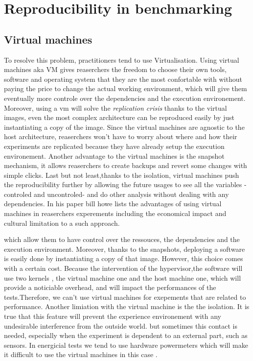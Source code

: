 


\section{Reproducibility in benchmarking }




\subsection{Virtual machines}
To resolve this problem, practitioners tend to use Virtualisation. Using virtual machines aka VM gives reaserchers the freedom to choose their own tools, software and operating system that they are the most confortable with without paying the price to change the actual working environment, which will give them eventually more controle over the dependencies and the execution environement. Moreover, using a vm will solve the \emph{replication crisis} thanks to the virtual images, even the most complex architecture can be reproduced easily by just instantiating a copy of the image. Since the virtual machines are agnostic to the host architecture, reaserchers won't have to worry about where and how their experiments are replicated because they have already setup the execution environement. Another advantage to the virtual machines is the snapshot mechanism, it allows reaserchers to create backups and revert some changes with simple clicks. Last but not least,thanks to the isolation, virtual machines push the reproducibility further by allowing the future usages to see all the variables -controled and uncontroled-  and do other analysis without dealing with any dependencies. In his paper \cite{howe_virtual_2012} bill howe lists the advantages of using virtual machines in reaserchers experements including the economical impact and cultural limitation to a such approach.

which allow them to have control over the ressouces, the dependencies and the execution environment. Moreover, thanks to the snapshots, deploying a software is easily done by instantiating a copy of that image.
However, this choice comes with a certain cost. Because the intervention of the hypervisor,the software will use two kernels , the virtual machine one and the host machine one, which will provide a noticiable overhead, and will impact the performances of the tests.Therefore, we can't use virtual machines for exepements that are related to performance. Another limiation with the virtual machine is the the isolation. It is true that this feature will prevent the experience environement with any undesirable interference from the outside world. but sometimes this contact is needed, especially when the experiment is dependent to an external part, such as sensors. In energicial tests we tend to use hardware powermeters which will make it difficult to use the virtual machines in this case .

